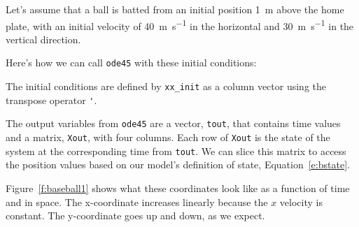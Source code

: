 Let's assume that a ball is batted from an initial position \SI{1}{\meter} above the home plate, with an initial velocity of \SI{40}{\meter\per\second} in the horizontal and \SI{30}{\meter\per\second} in the vertical direction.


Here's how we can call \lstinline{ode45} with these initial conditions:



The initial conditions are defined by \lstinline{xx_init} as a column vector using the transpose operator \lstinline{'}.

The output variables from \lstinline{ode45} are a vector, \lstinline{tout}, that contains time values and a matrix, \lstinline{Xout}, with four columns.  Each row of \lstinline{Xout} is the state of the system at the corresponding time from \lstinline{tout}.  We can slice this matrix to access the position values based on our model's definition of state, Equation~\ref{e:bstate}.


Figure~\ref{f:baseball1} shows what these coordinates look like as a function of time and in space.  The x-coordinate increases linearly because the $x$ velocity is constant.  The y-coordinate goes up and down, as we expect.

